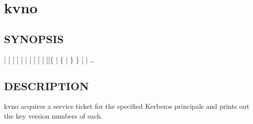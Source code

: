 \documentclass[letterpaper,10pt,english]{sphinxmanual}
\begin{document}
\section{kvno}
\label{\detokenize{user/user_commands/kvno:kvno}}\label{\detokenize{user/user_commands/kvno:kvno-1}}\label{\detokenize{user/user_commands/kvno::doc}}

\subsection{SYNOPSIS}
\label{\detokenize{user/user_commands/kvno:synopsis}}
\sphinxAtStartPar
{}
{[} \sphinxstyleemphasis{ccache}{]}
{[} \sphinxstyleemphasis{etype}{]}
{[} \sphinxstyleemphasis{keytab}{]}
{[}\sphinxstylestrong{\sphinxhyphen{}q}{]}
{[} |  \sphinxstyleemphasis{sname}{]}
{[}\sphinxstylestrong{\sphinxhyphen{}P}{]}
{[}\sphinxstylestrong{\textendash{}cached\sphinxhyphen{}only}{]}
{[}\sphinxstylestrong{\textendash{}no\sphinxhyphen{}store}{]}
{[} \sphinxstyleemphasis{cache}{]}
{[}{[}\{  | \{ | \} \} {[}\sphinxstylestrong{\sphinxhyphen{}P}{]}{]} |  \sphinxstyleemphasis{ccache}{]}
 …


\subsection{DESCRIPTION}
\label{\detokenize{user/user_commands/kvno:description}}
\sphinxAtStartPar
kvno acquires a service ticket for the specified Kerberos principals
and prints out the key version numbers of each.
\end{document}
